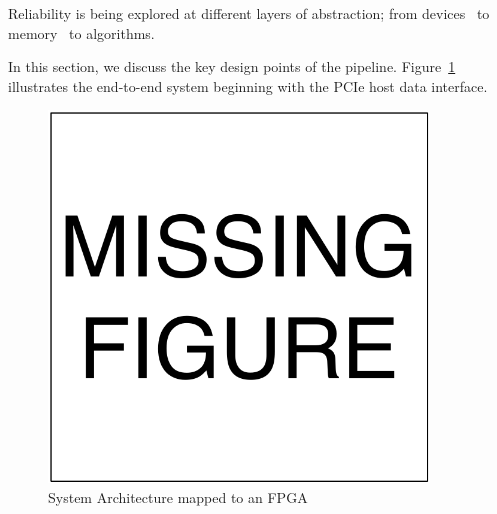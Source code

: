 
Reliability is being explored at different layers of abstraction; from devices~\cite{Datta2014,Datta2015,Rahul2015} to memory~\cite{isca2014} to algorithms.

In this section, we discuss the key design points of the pipeline.
Figure~\ref{fig:sys_arch} illustrates the end-to-end system beginning with the PCIe host data interface.

\begin{figure}[htb!]
\vspace{0pt}
\centering
\includegraphics[width=0.9\textwidth]{./figures/MissingFigure.pdf}
\vspace{0pt}
\caption{System Architecture mapped to an FPGA}\label{fig:sys_arch}
\vspace{0pt}
\end{figure}

